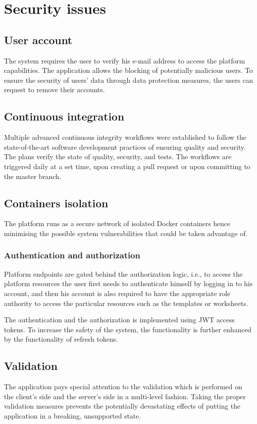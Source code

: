 \documentclass[a4paper,twoside,12pt]{book}
\begin{document}
\section{Security issues}

\subsection{User account}
The system requires the user to verify his e-mail address to access the platform capabilities. The application allows the blocking of potentially malicious users. To ensure the security of users' data through data protection measures, the users can request to remove their accounts.

\subsection{Continuous integration}
Multiple advanced continuous integrity workflows were established to follow the state-of-the-art software development practices of ensuring quality and security. The plans verify the state of quality, security, and tests. The workflows are triggered daily at a set time, upon creating a pull request or upon committing to the master branch.

\subsection{Containers isolation}
The platform runs as a secure network of isolated Docker containers hence minimising the possible system vulnerabilities that could be taken advantage of.

\subsubsection{Authentication and authorization}
Platform endpoints are gated behind the authorization logic, i.e., to access the platform resources the user first needs to authenticate himself by logging in to his account, and then his account is also required to have the appropriate role authority to access the particular resources such as the templates or worksheets.

The authentication and the authorization is implemented using JWT access tokens. To increase the safety of the system, the functionality is further enhanced by the functionality of refresh tokens.

\subsection{Validation}
The application pays special attention to the validation which is performed on the client's side and the server's side in a multi-level fashion. Taking the proper validation measures prevents the potentially devastating effects of putting the application in a breaking, unsupported state.
\end{document}
